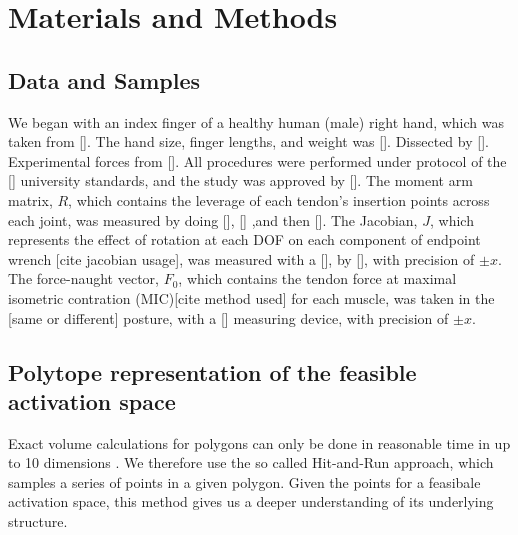\section{Materials and Methods}






\subsection{Data and Samples}
We began with an index finger of a healthy human (male) right hand, which was taken from []. The hand size, finger lengths, and weight was []. Dissected by []. Experimental forces from [].
All procedures were performed under protocol of the [] university standards, and the study was approved by []. 
The moment arm matrix, $R$, which contains the leverage of each tendon's insertion points across each joint, was measured by doing [], [] ,and then [].
The Jacobian, $J$, which represents the effect of rotation at each DOF on each component of endpoint wrench [cite jacobian usage], was measured with a [], by [], with precision of $\pm x$.
The force-naught vector, $F_0$, which contains the tendon force at maximal isometric contration (MIC)[cite method used] for each muscle, was taken in the [same or different] posture, with a [] measuring device, with precision of $\pm x$.



\subsection{Polytope representation of the feasible activation space}
Exact volume calculations for polygons can only be done in reasonable time in up to 10 dimensions \cite{Dyer2, Khachiyan, Khachiyan2}. We therefore use the so called Hit-and-Run approach, which samples a series of points in a given polygon. Given the points for a feasibale activation space, this method gives us a deeper understanding of its underlying structure. 



